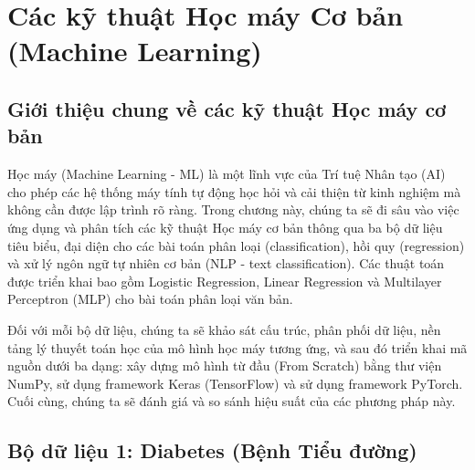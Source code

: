 \section{Các kỹ thuật Học máy Cơ bản (Machine Learning)}

\subsection{Giới thiệu chung về các kỹ thuật Học máy cơ bản}
Học máy (Machine Learning - ML) là một lĩnh vực của Trí tuệ Nhân tạo (AI) cho phép các hệ thống máy tính tự động học hỏi và cải thiện từ kinh nghiệm mà không cần được lập trình rõ ràng. Trong chương này, chúng ta sẽ đi sâu vào việc ứng dụng và phân tích các kỹ thuật Học máy cơ bản thông qua ba bộ dữ liệu tiêu biểu, đại diện cho các bài toán phân loại (classification), hồi quy (regression) và xử lý ngôn ngữ tự nhiên cơ bản (NLP - text classification). Các thuật toán được triển khai bao gồm Logistic Regression, Linear Regression và Multilayer Perceptron (MLP) cho bài toán phân loại văn bản.

Đối với mỗi bộ dữ liệu, chúng ta sẽ khảo sát cấu trúc, phân phối dữ liệu, nền tảng lý thuyết toán học của mô hình học máy tương ứng, và sau đó triển khai mã nguồn dưới ba dạng: xây dựng mô hình từ đầu (From Scratch) bằng thư viện NumPy, sử dụng framework Keras (TensorFlow) và sử dụng framework PyTorch. Cuối cùng, chúng ta sẽ đánh giá và so sánh hiệu suất của các phương pháp này.

\newpage
\subsection{Bộ dữ liệu 1: Diabetes (Bệnh Tiểu đường)}

